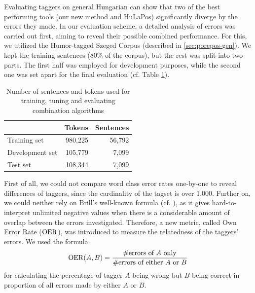 Evaluating taggers on general Hungarian can show that two of the best performing tools (our new method and HuLaPos) significantly diverge by the errors they made.
In our evaluation scheme, a detailed analysis of errors was carried out first, aiming to reveal their possible combined performance.
For this, we utilized the Humor-tagged Szeged Corpus (described in \ref{sec:porepos-gen}).
We kept the training sentences (80\% of the corpus), but the rest was split into two parts. The first half was employed for development purposes, while the second one was set apart for the final evaluation (cf. Table \ref{tab:comb-data}).

\begin{table}[H]
\centering
\caption{Number of sentences and tokens used for training, tuning and evaluating combination algorithms}\label{tab:comb-data}
\begin{tabular}{l r r}
\hline
& Tokens & Sentences \\
\hline
Training set & 980,225 & 56,792\\
Development set & 105,779 & 7,099 \\
Test set & 108,344 & 7,099 \\
\hline
\end{tabular}
\end{table}

First of all, we could not compare word class error rates one-by-one to reveal differences of taggers, since the cardinality of the tagset is over 1,000.
Further on, we could neither rely on Brill's well-known formula (cf. \cite{Brill1998}), as it gives hard-to-interpret unlimited negative values when there is a considerable amount of overlap between the errors investigated.
Therefore, a new metric, called Own Error Rate ($\operatorname{OER}$), was introduced to measure the relatedness of the taggers' errors.
We used the formula 
\begin{equation}
\operatorname{OER}(A,B)=\frac{\text{\#errors of }A\text{ only}}{\text{\#errors of either }A\text{ or }B}
\end{equation}
for calculating the percentage of tagger $A$ being wrong but $B$ being correct in proportion of all errors made by either $A$ or $B$.

